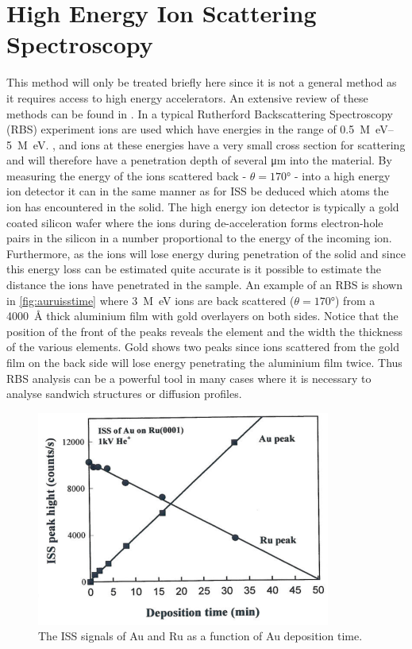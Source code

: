 \section{High Energy Ion Scattering Spectroscopy}
This method will only be treated briefly here since it is not a general method as it requires access to high energy accelerators. An extensive review of these methods can be found in \cite{feldman}. In a typical Rutherford Backscattering Spectroscopy (RBS) experiment ions are used which have energies in the range of \SIrange{0.5}{5}{M\electronvolt}. ,  and  ions at these energies have a very small cross section for scattering and will therefore have a penetration depth of several \si{\micro m} into the material. By measuring the energy of the ions scattered back - $\theta=\ang{170}$  - into a high energy ion detector it can in the same manner as for ISS be deduced which atoms the ion has encountered in the solid. The high energy ion detector is typically a gold coated silicon wafer where the ions during de-acceleration forms electron-hole pairs in the silicon in a number proportional to the energy of the incoming ion. Furthermore, as the ions will lose energy during penetration of the solid and since this energy loss can be estimated quite accurate is it possible to estimate the distance the ions have penetrated in the sample. An example of an RBS is shown in \autoref{fig:auruisstime} where \SI{3}{M\electronvolt}  ions are back scattered ($\theta=\ang{170}$) from a \SI{4000}{\angstrom} thick aluminium film with gold overlayers on both sides. Notice that the position of the front of the peaks reveals the element and the width the thickness of the various elements. Gold shows two peaks since ions scattered from the gold film on the back side will lose energy penetrating the aluminium film twice. Thus RBS analysis can be a powerful tool in many cases where it is necessary to analyse sandwich structures or diffusion profiles.

\begin{figure}[h!]
	\begin{center}
	\includegraphics[scale=4]{figures/11_04.png}
	\caption{The ISS signals of Au and Ru as a function of Au deposition time.}
	\label{fig:auruisstime}
	\end{center}
\end{figure}

